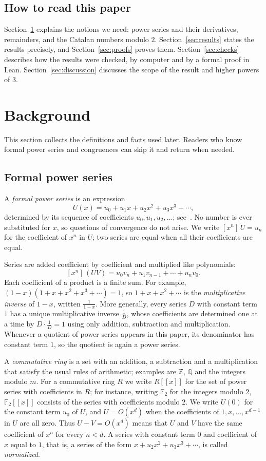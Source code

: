 \documentclass[11pt,a4paper]{article}
\theoremstyle{definition}
\theoremstyle{remark}
\newcommand{\Z}{\mathbb{Z}}
\newcommand{\Q}{\mathbb{Q}}
\newcommand{\F}{\mathbb{F}}
\newcommand{\ps}[1]{#1[[x]]}
\newcommand{\coeff}[2]{[x^{#1}]\,#2}
\begin{document}
\subsection{How to read this paper}
Section~\ref{sec:background} explains the notions we need: power series and their derivatives, remainders, and the
Catalan numbers modulo $2$. Section~\ref{sec:results} states the results precisely, and Section~\ref{sec:proofs} proves
them. Section~\ref{sec:checks} describes how the results were checked, by computer and by a formal proof in Lean.
Section~\ref{sec:discussion} discusses the scope of the result and higher powers of $3$.
\section{Background}\label{sec:background}
This section collects the definitions and facts used later. Readers who know formal power series and congruences can skip it and return when needed.
\subsection{Formal power series}
A \emph{formal power series} is an expression
\[
U(x)=u_0+u_1x+u_2x^2+u_3x^3+\cdots ,
\]
determined by its sequence of coefficients $u_0,u_1,u_2,\dots$; see~\cite{niven,stanley}. No number is ever
substituted for $x$, so questions of convergence do not arise. We write $\coeff{n}{U}=u_n$ for the coefficient of $x^n$ in $U$; two series are equal
when all their coefficients are equal.

Series are added coefficient by coefficient and multiplied like polynomials:
\[
\coeff{n}{(UV)}=u_0v_n+u_1v_{n-1}+\cdots+u_nv_0 .
\]
Each coefficient of a product is a finite sum. For example, $(1-x)(1+x+x^2+x^3+\cdots)=1$, so $1+x+x^2+\cdots$ is
the \emph{multiplicative inverse} of $1-x$, written $\frac{1}{1-x}$. More generally, every series $D$ with constant term
$1$ has a unique multiplicative inverse $\frac1D$, whose coefficients are determined one at a time by $D\cdot\frac1D=1$
using only addition, subtraction and multiplication. Whenever a quotient of power series appears in this paper, its
denominator has constant term $1$, so the quotient is again a power series.

A \emph{commutative ring} is a set with an addition, a subtraction and a multiplication that satisfy the usual rules
of arithmetic; examples are $\Z$, $\Q$ and the integers modulo $m$. For a commutative ring $R$ we write $\ps{R}$ for
the set of power series with coefficients in $R$; for instance, writing $\F_2$ for the integers modulo $2$, $\ps{\F_2}$
consists of the series with coefficients modulo $2$. We write
$U(0)$ for the constant term $u_0$ of $U$, and $U=O(x^d)$ when the coefficients of $1,x,\dots,x^{d-1}$ in $U$ are all
zero. Thus $U-V=O(x^d)$ means that $U$ and $V$ have the same coefficient of $x^n$ for every $n<d$. A series with
constant term $0$ and coefficient of $x$ equal to $1$, that is, a series of the form $x+u_2x^2+u_3x^3+\cdots$, is
called \emph{normalized}.
\end{document}
